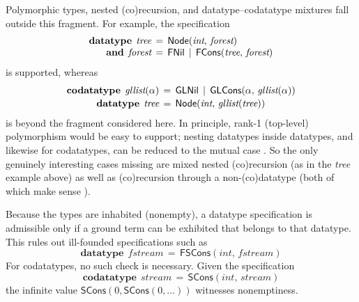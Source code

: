 \documentclass[a4paper,oribibl,envcountsame,draft]{llncs}
\newcommand\keyw[1]{\textbf{#1}}
\newcommand\const[1]{\textsf{#1}}
\newcommand\ty[1]{\textit{#1}}
\begin{document}
Polymorphic types, nested (co)recursion, and datatype--codatatype mixtures fall
outside this fragment. For example, the specification
\[\begin{aligned}[t]
      \keyw{datatype}\;\, \ty{tree} & \,=\, \const{Node}(\ty{int},\, \ty{forest}) \\[-\jot]
      \keyw{and}\;\, \ty{forest} & \,=\, \const{FNil} \,\mid\, \const{FCons}(\ty{tree},\, \ty{forest})
\end{aligned}
\]
is supported, whereas
\[\begin{aligned}[t]
      \keyw{codatatype}\; \,\ty{gllist}(\alpha) & \,=\, \const{GLNil} \,\mid\, \const{GLCons}(\alpha,\, \ty{gllist}(\alpha)) \\[-.5\jot]
      \keyw{datatype}\;\, \ty{tree} & \,=\, \const{Node}(\ty{int},\, \ty{gllist}(\ty{tree}))
\end{aligned}
\]
is beyond the fragment considered here. In principle, rank-1 (top-level)
polymorphism would be easy to support; nesting datatypes inside datatypes, and
likewise for codatatypes, can be reduced to the mutual case
\cite{gunter-1993-not}. So the only genuinely interesting cases missing are
mixed nested (co)recursion (as in the \ty{tree} example above) as well as
(co)recursion through a non-(co)datatype (both of which make sense
\cite{blanchette-et-al-2014-codata}).

Because the types are inhabited (nonempty), a datatype specification is
admissible only if a ground term can be exhibited that belongs to that datatype.
This rules out ill-founded specifications such as
%
\[\keyw{datatype}\;\, \ty{fstream} \,=\, \const{FSCons}(\ty{int},\,\ty{fstream})\]
%
For codatatypes, no such check is necessary. Given the specification
%
\[\keyw{codatatype}\;\, \ty{stream} \,=\, \const{SCons}(\ty{int},\,\ty{stream})\]
%
the infinite value $\const{SCons}(0, \const{SCons}(0, \ldots))$ witnesses
nonemptiness.
\end{document}
